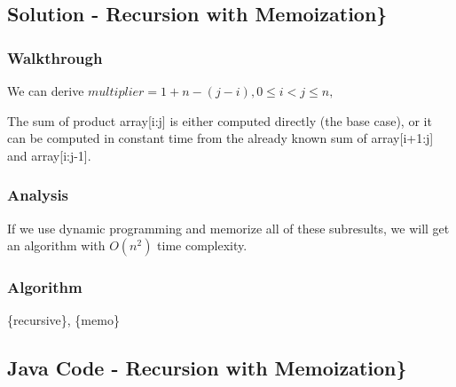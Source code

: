 \documentclass[]{book}
\begin{document}
\hypertarget{solution---recursion-with-memoization}{%
\subsection{Solution - Recursion with Memoization\}}\label{solution---recursion-with-memoization}}

\hypertarget{walkthrough-37}{%
\subsubsection{Walkthrough}\label{walkthrough-37}}

We can derive \(multiplier = 1 + n - (j - i), 0 \le i < j \le n,\)

The sum of product array{[}i:j{]} is either computed directly (the base case), or it can be computed in constant time from
the already known sum of array{[}i+1:j{]} and array{[}i:j-1{]}.

\hypertarget{analysis-40}{%
\subsubsection{Analysis}\label{analysis-40}}

If we use dynamic programming and memorize all of these subresults, we will get an algorithm with \(O(n^2)\) time
complexity.

\hypertarget{algorithm-40}{%
\subsubsection{Algorithm}\label{algorithm-40}}

\{recursive\}, \{memo\}

\hypertarget{java-code---recursion-with-memoization}{%
\subsection{Java Code - Recursion with Memoization\}}\label{java-code---recursion-with-memoization}}
\end{document}
